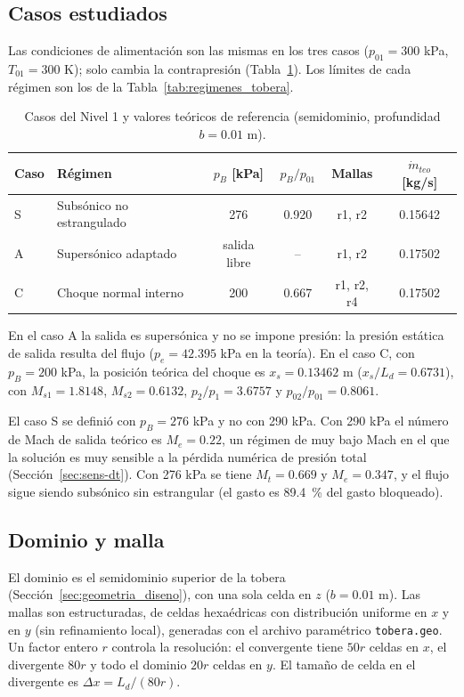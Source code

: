 \documentclass[12pt,letterpaper]{article}
\numberwithin{equation}{section}
\begin{document}
\subsection{Casos estudiados}

Las condiciones de alimentación son las mismas en los tres casos ($p_{01}=300$ kPa, $T_{01}=300$ K); solo cambia la contrapresión (Tabla~\ref{tab:casos}). Los límites de cada régimen son los de la Tabla~\ref{tab:regimenes_tobera}.

\begin{table}[H]
\centering
\caption{Casos del Nivel 1 y valores teóricos de referencia (semidominio, profundidad $b=0.01$ m).}
\label{tab:casos}
\renewcommand{\arraystretch}{1.2}
\small
\begin{tabular}{llcccc}
\toprule
\textbf{Caso} & \textbf{Régimen} & $p_B$ [kPa] & $p_B/p_{01}$ & \textbf{Mallas} & $\dot m_{teo}$ [kg/s] \\
\midrule
S & Subsónico no estrangulado & 276 & 0.920 & r1, r2 & 0.15642 \\
A & Supersónico adaptado & salida libre & -- & r1, r2 & 0.17502 \\
C & Choque normal interno & 200 & 0.667 & r1, r2, r4 & 0.17502 \\
\bottomrule
\end{tabular}
\end{table}

En el caso A la salida es supersónica y no se impone presión: la presión estática de salida resulta del flujo ($p_e=42.395$ kPa en la teoría). En el caso C, con $p_B=200$ kPa, la posición teórica del choque es $x_s=0.13462$ m ($x_s/L_d=0.6731$), con $M_{s1}=1.8148$, $M_{s2}=0.6132$, $p_2/p_1=3.6757$ y $p_{02}/p_{01}=0.8061$.

El caso S se definió con $p_B=276$ kPa y no con 290 kPa. Con 290 kPa el número de Mach de salida teórico es $M_e=0.22$, un régimen de muy bajo Mach en el que la solución es muy sensible a la pérdida numérica de presión total (Sección~\ref{sec:sens-dt}). Con 276 kPa se tiene $M_t=0.669$ y $M_e=0.347$, y el flujo sigue siendo subsónico sin estrangular (el gasto es 89.4~\% del gasto bloqueado).

\subsection{Dominio y malla}

El dominio es el semidominio superior de la tobera (Sección~\ref{sec:geometria_diseno}), con una sola celda en $z$ ($b=0.01$ m). Las mallas son estructuradas, de celdas hexaédricas con distribución uniforme en $x$ y en $y$ (sin refinamiento local), generadas con el archivo paramétrico \texttt{tobera.geo}. Un factor entero $r$ controla la resolución: el convergente tiene $50r$ celdas en $x$, el divergente $80r$ y todo el dominio $20r$ celdas en $y$. El tamaño de celda en el divergente es $\Delta x=L_d/(80r)$.
\end{document}
